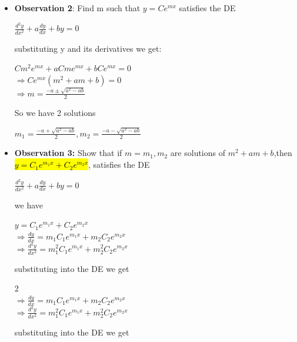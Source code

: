 \documentclass{article}
\begin{document}
\begin{enumerate}
\begin{itemize}
          \item \textbf{Observation 2}: Find m such that $y = Ce^{mx}$ satisfies the DE
          \begin{center}
            $\frac{d^2y}{dx^2} + a\frac{dy}{dx} + by = 0$
          \end{center}
          substituting y and its derivatives we get:
          \begin{center}
            $Cm^2e^{mx} + aCme^{mx} + bCe^{mx} = 0$\\
            $\Rightarrow Ce^{mx}(m^2+am+ b) = 0$\\
            $\Rightarrow m = \frac{-a \pm \sqrt{a^2 - ab}}{2} $
          \end{center}

          So we have  2 solutions

          \begin{center}
            $m_1 = \frac{-a + \sqrt{a^2 - ab}}{2}, m_2 = \frac{-a - \sqrt{a^2 - ab}}{2}$
          \end{center}       

          \item \textbf{Observation 3:} Show that if $m = m_1,m_2$ are solutions of $m^2 + am +b$,then \hl{$y = C_1e^{m_1x} + C_2e^{m_2x}$}, satisfies the DE

          \begin{center}
            $\frac{d^2y}{dx^2} + a\frac{dy}{dx} + by = 0$
          \end{center}

          we have 
          \begin{center}
            $y = C_1e^{m_1x} + C_2e^{m_2x}$\\
            $\Rightarrow \frac{dy}{dx} = m_1C_1e^{m_1x} + m_2C_2e^{m_2x}$\\
            $\Rightarrow \frac{d^2y}{dx^2} = m_1^2C_1e^{m_1x} + m_2^2C_2e^{m_2x}$
          \end{center}

          substituting into the DE we get

          \begin{center}
            $2$\\
            $\Rightarrow \frac{dy}{dx} = m_1C_1e^{m_1x} + m_2C_2e^{m_2x}$\\
            $\Rightarrow \frac{d^2y}{dx^2} = m_1^2C_1e^{m_1x} + m_2^2C_2e^{m_2x}$
          \end{center}

          substituting into the DE we get 


\end{itemize}
\end{enumerate}
\end{document}
